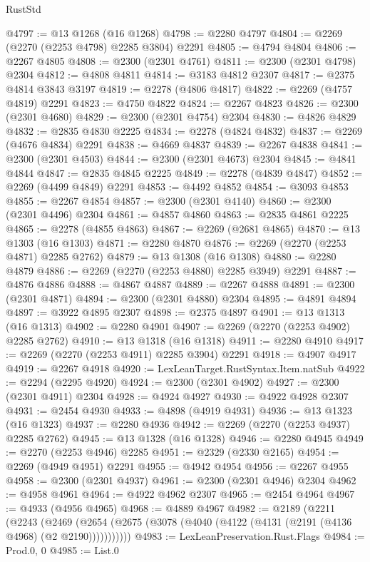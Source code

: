 \begin{lexlean}{RustStd}
\begin{coremodule}
@4797 := @13 @1268 (@16 @1268)
@4798 := @2280 @4797
@4804 := @2269 (@2270 (@2253 @4798) @2285 @3804) @2291
@4805 := @4794 @4804
@4806 := @2267 @4805
@4808 := @2300 (@2301 @4761)
@4811 := @2300 (@2301 @4798) @2304
@4812 := @4808 @4811
@4814 := @3183 @4812 @2307
@4817 := @2375 @4814 @3843 @3197
@4819 := @2278 (@4806 @4817)
@4822 := @2269 (@4757 @4819) @2291
@4823 := @4750 @4822
@4824 := @2267 @4823
@4826 := @2300 (@2301 @4680)
@4829 := @2300 (@2301 @4754) @2304
@4830 := @4826 @4829
@4832 := @2835 @4830 @2225
@4834 := @2278 (@4824 @4832)
@4837 := @2269 (@4676 @4834) @2291
@4838 := @4669 @4837
@4839 := @2267 @4838
@4841 := @2300 (@2301 @4503)
@4844 := @2300 (@2301 @4673) @2304
@4845 := @4841 @4844
@4847 := @2835 @4845 @2225
@4849 := @2278 (@4839 @4847)
@4852 := @2269 (@4499 @4849) @2291
@4853 := @4492 @4852
@4854 := @3093 @4853
@4855 := @2267 @4854
@4857 := @2300 (@2301 @4140)
@4860 := @2300 (@2301 @4496) @2304
@4861 := @4857 @4860
@4863 := @2835 @4861 @2225
@4865 := @2278 (@4855 @4863)
@4867 := @2269 (@2681 @4865)
@4870 := @13 @1303 (@16 @1303)
@4871 := @2280 @4870
@4876 := @2269 (@2270 (@2253 @4871) @2285 @2762)
@4879 := @13 @1308 (@16 @1308)
@4880 := @2280 @4879
@4886 := @2269 (@2270 (@2253 @4880) @2285 @3949) @2291
@4887 := @4876 @4886
@4888 := @4867 @4887
@4889 := @2267 @4888
@4891 := @2300 (@2301 @4871)
@4894 := @2300 (@2301 @4880) @2304
@4895 := @4891 @4894
@4897 := @3922 @4895 @2307
@4898 := @2375 @4897
@4901 := @13 @1313 (@16 @1313)
@4902 := @2280 @4901
@4907 := @2269 (@2270 (@2253 @4902) @2285 @2762)
@4910 := @13 @1318 (@16 @1318)
@4911 := @2280 @4910
@4917 := @2269 (@2270 (@2253 @4911) @2285 @3904) @2291
@4918 := @4907 @4917
@4919 := @2267 @4918
@4920 := LexLeanTarget.RustSyntax.Item.natSub
@4922 := @2294 (@2295 @4920)
@4924 := @2300 (@2301 @4902)
@4927 := @2300 (@2301 @4911) @2304
@4928 := @4924 @4927
@4930 := @4922 @4928 @2307
@4931 := @2454 @4930
@4933 := @4898 (@4919 @4931)
@4936 := @13 @1323 (@16 @1323)
@4937 := @2280 @4936
@4942 := @2269 (@2270 (@2253 @4937) @2285 @2762)
@4945 := @13 @1328 (@16 @1328)
@4946 := @2280 @4945
@4949 := @2270 (@2253 @4946) @2285
@4951 := @2329 (@2330 @2165)
@4954 := @2269 (@4949 @4951) @2291
@4955 := @4942 @4954
@4956 := @2267 @4955
@4958 := @2300 (@2301 @4937)
@4961 := @2300 (@2301 @4946) @2304
@4962 := @4958 @4961
@4964 := @4922 @4962 @2307
@4965 := @2454 @4964
@4967 := @4933 (@4956 @4965)
@4968 := @4889 @4967
@4982 := @2189
    (@2211
      (@2243
        (@2469 (@2654 (@2675 (@3078 (@4040 (@4122 (@4131 (@2191 (@4136 @4968) (@2 @2190)))))))))))
@4983 := LexLeanPreservation.Rust.Flags
@4984 := Prod.{0, 0}
@4985 := List.{0}

\end{coremodule}
\end{lexlean}

